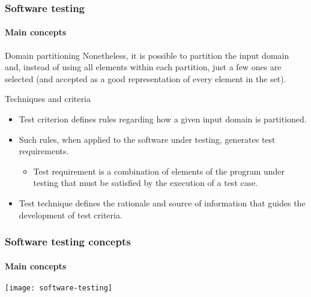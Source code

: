 \begin{frame}
\frametitle{Software testing}
\framesubtitle{Main concepts}

\begin{block:principle}{Domain partitioning}
Nonetheless, it is possible to partition the input domain and, instead of
using all elements within each partition, just a few ones are selected (and
accepted as a good representation of every element in the set).
\end{block:principle}

\begin{block:fact}{Techniques and criteria}
\begin{itemize}
	\item Test criterion defines rules regarding how a given input domain is
	partitioned.

	\item Such rules, when applied to the software under testing, generates
	test requirements.
	\begin{itemize}
		\item Test requirement is a combination of elements of the program
		under testing that must be satisfied by the execution of a test case.
	\end{itemize}

	\item Test technique defines the rationale and source of information that
	guides the development of test criteria.
\end{itemize}
\end{block:fact}
\end{frame}




\begin{frame}[c, hasprev=true, hasnext=false]
\frametitle{Software testing concepts}
\framesubtitle{Main concepts}

\begin{block:fact}{}
	\centering
	\texttt{[image: software-testing]}
\end{block:fact}
\end{frame}